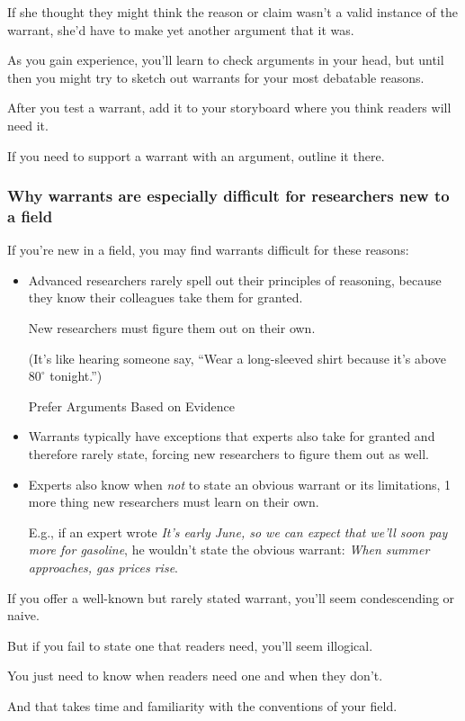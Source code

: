 \documentclass[oneside]{book}
\numberwithin{equation}{section}
\begin{document}
If she thought they might think the reason or claim wasn't a valid instance of the warrant, she'd have to make yet another argument that it was.

%
As you gain experience, you'll learn to check arguments in your head, but until then you might try to sketch out warrants for your most debatable reasons.

After you test a warrant, add it to your storyboard where you think readers will need it.

If you need to support a warrant with an argument, outline it there.

\subsubsection{Why warrants are especially difficult for researchers new to a field}
If you're new in a field, you may find warrants difficult for these reasons:
\begin{itemize}
    \item Advanced researchers rarely spell out their principles of reasoning, because they know their colleagues take them for granted.
    
    New researchers must figure them out on their own.
    
    (It's like hearing someone say, ``Wear a long-sleeved shirt because it's above $80^\circ$ tonight.'')
    
    Prefer Arguments Based on Evidence
    \item Warrants typically have exceptions that experts also take for granted and therefore rarely state, forcing new researchers to figure them out as well.
    \item Experts also know when \textit{not} to state an obvious warrant or its limitations, 1 more thing new researchers must learn on their own.
    
    E.g., if an expert wrote \textit{It's early June, so we can expect that we'll soon pay more for gasoline}, he wouldn't state the obvious warrant: \textit{When summer approaches, gas prices rise}.
\end{itemize}
If you offer a well-known but rarely stated warrant, you'll seem condescending or naive.

But if you fail to state one that readers need, you'll seem illogical.

You just need to know when readers need one and when they don't.

And that takes time and familiarity with the conventions of your field.
\end{document}
